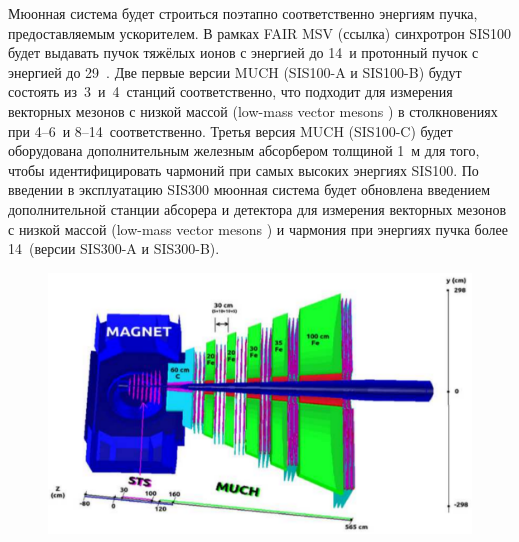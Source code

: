 Мюонная система будет строиться поэтапно соответственно энергиям пучка, предоставляемым ускорителем. В рамках FAIR MSV (\todo ссылка) синхротрон SIS100 будет выдавать пучок тяжёлых ионов с энергией до 14~\GeVperNucl и протонный пучок с энергией до 29~\GeVperNucl. Две первые версии MUCH (SIS100-A и SIS100-B) будут состоять из~3~и~4~станций соответственно, что подходит для измерения векторных мезонов с низкой массой (low-mass vector mesons \todo) в столкновениях при 4--6~\GeVperNucl и 8--14~\GeVperNucl соответственно. Третья версия MUCH (SIS100-C) будет оборудована дополнительным железным абсорбером толщиной 1~м для того, чтобы идентифицировать чармоний при самых высоких энергиях SIS100. 
По введении в эксплуатацию SIS300 мюонная система будет обновлена введением дополнительной станции абсорера и детектора для измерения векторных мезонов с низкой массой (low-mass vector mesons \todo) и чармония при энергиях пучка более 14~\GeVperNucl (версии SIS300-A и SIS300-B).


\begin{figure}[H]
\includegraphics[width=1.0\textwidth]{pictures/MUCH.png}
\caption{}
\label{fig:MUCH}
\end{figure}

